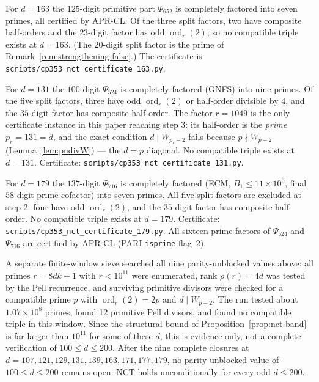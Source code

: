 \documentclass[11pt]{amsart}
\theoremstyle{plain}
\theoremstyle{definition}
\theoremstyle{remark}
\numberwithin{equation}{section}
\newcommand{\ord}{\operatorname{ord}}
\begin{document}
For $d=163$ the $125$-digit primitive part $\Psi_{652}$ is completely factored into seven primes, all certified by APR-CL. Of the three split factors, two have composite half-orders and the $23$-digit factor has odd $\ord_r(2)$; so no compatible triple exists at $d=163$. (The $20$-digit split factor is the prime of Remark~\ref{rem:strengthening-false}.) The certificate is \texttt{scripts/}\allowbreak\texttt{cp353\_nct\_certificate\_163.py}.

For $d=131$ the $100$-digit $\Psi_{524}$ is completely factored (GNFS) into nine primes. Of the five split factors, three have odd $\ord_r(2)$ or half-order divisible by $4$, and the $35$-digit factor has composite half-order. The factor $r=1049$ is the only certificate instance in this paper reaching step 3: its half-order is the \emph{prime} $p_r=131=d$, and the exact condition $d \mid W_{p_r-2}$ fails because $p \nmid W_{p-2}$ (Lemma~\ref{lem:pndivW}) --- the $d = p$ diagonal. No compatible triple exists at $d=131$. Certificate: \texttt{scripts/}\allowbreak\texttt{cp353\_nct\_certificate\_131.py}.

For $d=179$ the $137$-digit $\Psi_{716}$ is completely factored (ECM, $B_1 \leq 11{\times}10^6$, final $58$-digit prime cofactor) into seven primes. All five split factors are excluded at step 2: four have odd $\ord_r(2)$, and the $35$-digit factor has composite half-order. No compatible triple exists at $d=179$. Certificate: \texttt{scripts/}\allowbreak\texttt{cp353\_nct\_certificate\_179.py}. All sixteen prime factors of $\Psi_{524}$ and $\Psi_{716}$ are certified by APR-CL (PARI \texttt{isprime} flag~$2$).

A separate finite-window sieve searched all nine parity-unblocked values above: all primes $r=8dk+1$ with $r<10^{11}$ were enumerated, rank $\rho(r)=4d$ was tested by the Pell recurrence, and surviving primitive divisors were checked for a compatible prime $p$ with $\ord_r(2)=2p$ and $d\mid W_{p-2}$. The run tested about $1.07\times10^8$ primes, found 12 primitive Pell divisors, and found no compatible triple in this window. Since the structural bound of Proposition~\ref{prop:nct-band} is far larger than $10^{11}$ for some of these $d$, this is evidence only, not a complete verification of $100\leq d\leq200$. After the nine complete closures at $d=107,121,129,131,139,163,171,177,179$, no parity-unblocked value of $100 \leq d \leq 200$ remains open: NCT holds unconditionally for every odd $d \leq 200$.
\end{document}
